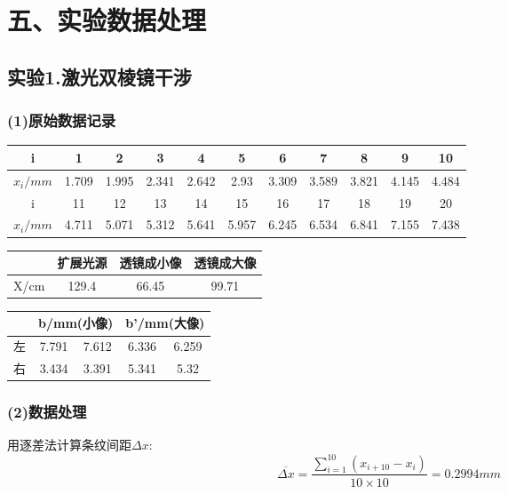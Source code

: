 \documentclass[11pt,a4paper,oneside]{article}
\begin{document}
\section*{五、实验数据处理}
\subsection*{实验1.激光双棱镜干涉}
\subsubsection*{(1)原始数据记录}

\begin{center}
\begin{table}[htbp]
\begin{tabular}{|c|c|c|c|c|c|c|c|c|c|c|}
\hline 
i & 1 & 2 & 3 & 4 & 5 & 6 & 7 & 8 & 9 & 10 
\\ 
\hline 
$x_i/mm$
&1.709&1.995&2.341&2.642&2.93&3.309&3.589&3.821&4.145&4.484
\\ 
\hline 
i & 11 & 12 & 13 & 14 & 15 & 16 & 17 & 18 & 19 & 20 
\\ 
\hline 
$x_i/mm$ 
&4.711&5.071&5.312&5.641&5.957&6.245&6.534&6.841&7.155&7.438
\\ 
\hline 
\end{tabular} 
\end{table}
\begin{table}[htbp]
\begin{tabular}{|c|c|c|c|}
\hline 
   & 扩展光源 & 透镜成小像 & 透镜成大像 \\ 
\hline 
X/cm 
&129.4
&66.45
&99.71

\\
\hline 
\end{tabular} 
\end{table}
\begin{table}[htbp]
\begin{tabular}{|c|c|c|c|c|}
\hline  
 & \multicolumn{2}{|c|}{b/mm(小像) }& \multicolumn{2}{|c|}{b'/mm(大像)} \\ 
\hline 
左 & 7.791 &7.612 & 6.336 & 6.259 \\ 
\hline 
右 & 3.434 &3.391 & 5.341 & 5.32 \\ 
\hline 
\end{tabular}
\end{table}
\end{center}

\subsubsection*{(2)数据处理}
用逐差法计算条纹间距${\Delta}x$:
$$\overline{{\Delta}x} = \displaystyle\frac{\sum\limits_{i=1}^{10}(x_{i+10}-x_i)}{10{\times}10} = 0.2994mm$$
\end{document}
